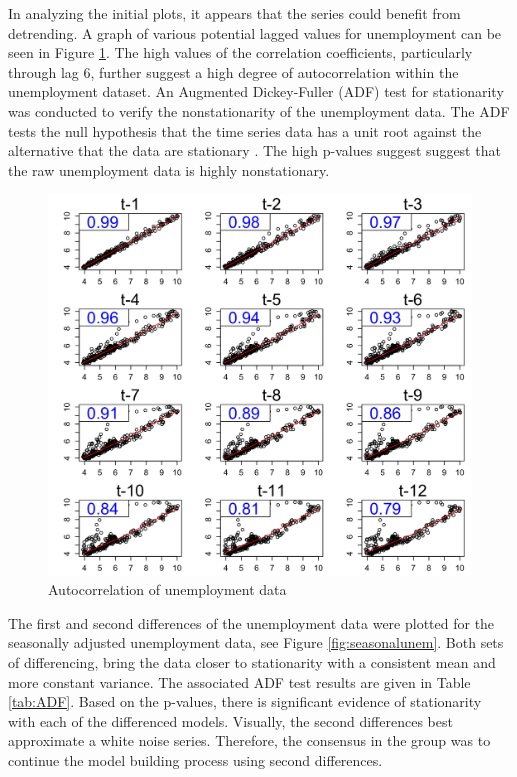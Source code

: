 \documentclass[twoside,twocolumn]{article}
\begin{document}
In analyzing the initial plots, it appears that the series could benefit from detrending. A graph of various potential lagged values for unemployment can be seen in Figure \ref{fig:laggedunemployment}. The high values of the correlation coefficients, particularly through lag 6, further suggest a high degree of autocorrelation within the unemployment dataset.    An Augmented Dickey-Fuller (ADF) test for stationarity was conducted to verify the nonstationarity of the unemployment data.  The ADF tests the null hypothesis that the time series data has a unit root against the alternative that the data are stationary \citep{Shumway2006}. The high p-values suggest suggest that the raw unemployment data is highly nonstationary.

		\begin{figure}[htb]
		\centering
		\caption{Autocorrelation of unemployment data}
		\label{fig:laggedunemployment}
		\includegraphics[width=\linewidth]{images/laggedunemployment}
	\end{figure}
The first and second differences of the unemployment data were plotted for the seasonally adjusted unemployment data, see Figure \ref{fig:seasonalunem}. Both sets of differencing, bring the data closer to stationarity with a consistent mean and more constant variance. The associated ADF test results are given in Table \ref{tab:ADF}. Based on the p-values, there is significant evidence of stationarity with each of the differenced models. Visually, the second differences best approximate a white noise series. Therefore, the consensus in the group was to continue the model building process using second differences.
\end{document}
